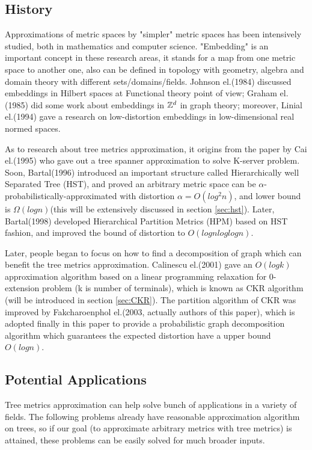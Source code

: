 \documentclass[11pt,twocolumn]{IEEEtran}
\begin{document}
\subsection{History}
Approximations of metric spaces by "simpler" metric spaces has been intensively studied, both in
mathematics and computer science. 
"Embedding" is an important concept in these research areas,
it stands for a map from one metric space to another one, 
also can be defined in topology with geometry, algebra and domain theory with different sets/domains/fields. Johnson el.(1984)\cite{hilbert} discussed embeddings in Hilbert spaces at Functional
theory point of view; Graham el.(1985)\cite{zd} did some work about embeddings in ${\mathbb{Z}}^d$ in graph theory; moreover,
Linial el.(1994)\cite{realnorm} gave a research on low-distortion embeddings in low-dimensional real normed spaces.

As to research about tree metrics approximation, it origins from the paper by Cai el.(1995)\cite{Cai}
who gave out a tree spanner approximation to solve K-server problem. Soon, Bartal(1996)\cite{hst} introduced
an important structure called Hierarchically well Separated Tree (HST), and proved an arbitrary metric 
space can be $\alpha$-probabilistically-approximated with distortion $\alpha=O(log^2n)$, and lower bound is
$\Omega(logn)$(this will be extensively discussed in section \ref{sec:hst}). Later, Bartal(1998)\cite{bartal98}
developed Hierarchical Partition Metrics (HPM) based on HST fashion, and improved the bound of distortion
to $O(lognloglogn)$. 

Later, people began to focus on how to find a decomposition of graph which can 
benefit the tree metrics approximation. Calinescu el.(2001)\cite{CKR} gave an $O(logk)$ approximation
algorithm based on a linear programming relaxation for 0-extension problem (k is number of terminals), which is known as
CKR algorithm (will be introduced in section \ref{sec:CKR}). The partition algorithm of CKR
was improved by Fakcharoenphol el.(2003, actually authors of this paper)\cite{thispaper}, which is adopted finally
in this paper to provide a probabilistic graph decomposition algorithm which guarantees the expected distortion
have a upper bound $O(logn)$.

\subsection{Potential Applications}
\label{sec:potential}
Tree metrics approximation can help solve bunch of applications in a variety of fields. The following
problems already have reasonable approximation algorithm on trees, so if our goal (to approximate
arbitrary metrics with tree metrics) is attained, these problems can be easily solved for much broader
inputs.
\end{document}
